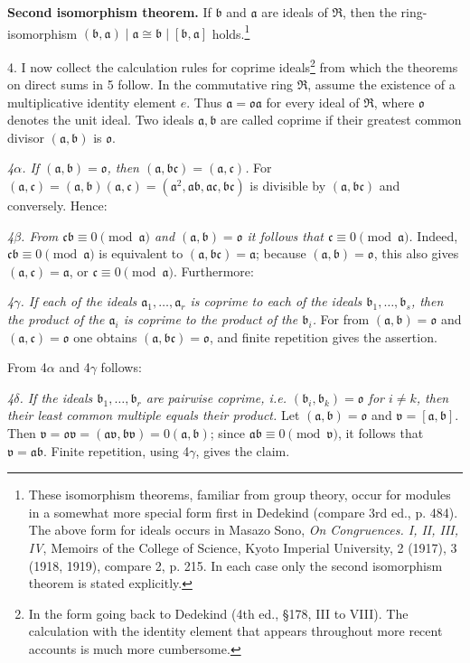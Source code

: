 \documentclass[11pt]{article}
\providecommand{\mR}{\mathfrak{R}}
\providecommand{\ma}{\mathfrak{a}}
\providecommand{\mb}{\mathfrak{b}}
\providecommand{\mc}{\mathfrak{c}}
\providecommand{\mo}{\mathfrak{o}}
\providecommand{\mv}{\mathfrak{v}}
\begin{document}
\textbf{Second isomorphism theorem.} If $\mb$ and $\ma$ are ideals of $\mR$, then the ring-isomorphism $(\mb,\ma)\mid\ma\cong\mb\mid[\mb,\ma]$ holds.\footnote{These isomorphism theorems, familiar from group theory, occur for modules in a somewhat more special form first in Dedekind (compare 3rd ed., p. 484). The above form for ideals occurs in Masazo Sono, \emph{On Congruences. I, II, III, IV}, Memoirs of the College of Science, Kyoto Imperial University, 2 (1917), 3 (1918, 1919), compare 2, p. 215. In each case only the second isomorphism theorem is stated explicitly.}

4. I now collect the calculation rules for coprime ideals\footnote{In the form going back to Dedekind (4th ed., §178, III to VIII). The calculation with the identity element that appears throughout more recent accounts is much more cumbersome.} from which the theorems on direct sums in 5 follow. In the commutative ring $\mR$, assume the existence of a multiplicative identity element $e$. Thus $\ma=\mo\ma$ for every ideal of $\mR$, where $\mo$ denotes the unit ideal. Two ideals $\ma,\mb$ are called coprime if their greatest common divisor $(\ma,\mb)$ is $\mo$.

\emph{4$\alpha$. If $(\ma,\mb)=\mo$, then $(\ma,\mb\mc)=(\ma,\mc)$.} For $(\ma,\mc)=(\ma,\mb)(\ma,\mc)=(\ma^2,\ma\mb,\ma\mc,\mb\mc)$ is divisible by $(\ma,\mb\mc)$ and conversely. Hence:

\emph{4$\beta$. From $\mc\mb\equiv0\pmod{\ma}$ and $(\ma,\mb)=\mo$ it follows that $\mc\equiv0\pmod{\ma}$.} Indeed, $\mc\mb\equiv0\pmod{\ma}$ is equivalent to $(\ma,\mb\mc)=\ma$; because $(\ma,\mb)=\mo$, this also gives $(\ma,\mc)=\ma$, or $\mc\equiv0\pmod{\ma}$. Furthermore:

\emph{4$\gamma$. If each of the ideals $\ma_1,
\ldots,\ma_r$ is coprime to each of the ideals $\mb_1,\ldots,\mb_s$, then the product of the $\ma_i$ is coprime to the product of the $\mb_i$.} For from $(\ma,\mb)=\mo$ and $(\ma,\mc)=\mo$ one obtains $(\ma,\mb\mc)=\mo$, and finite repetition gives the assertion.

From 4$\alpha$ and 4$\gamma$ follows:

\emph{4$\delta$. If the ideals $\mb_1,
\ldots,\mb_r$ are pairwise coprime, i.e. $(\mb_i,\mb_k)=\mo$ for $i\ne k$, then their least common multiple equals their product.} Let $(\ma,\mb)=\mo$ and $\mv=[\ma,\mb]$. Then $\mv=\mo\mv=(\ma\mv,\mb\mv)=0(\ma,\mb)$; since $\ma\mb\equiv0\pmod{\mv}$, it follows that $\mv=\ma\mb$. Finite repetition, using 4$\gamma$, gives the claim.
\end{document}
